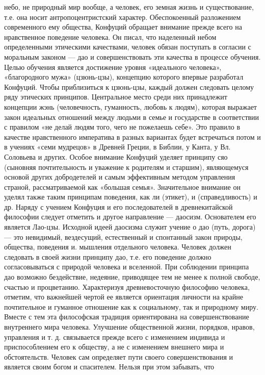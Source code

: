 \documentclass[12pt]{article}
\begin{document}
небо, не природный мир вообще, а человек, его земная жизнь и существование, т.е. она носит
антропоцентристский характер.
Обеспокоенный разложением современного ему общества, Конфуций обращает внимание прежде всего на
нравственное поведение человека. Он писал, что наделенный небом определенными этическими качествами,
человек обязан поступать в согласии с моральным законом — дао и совершенствовать эти качества в процессе
обучения. Целью обучения является достижение уровня «идеального человека», «благородного мужа» (цзюнь-цзы), концепцию которого впервые разработал Конфуций. Чтобы приблизиться к цзюнь-цзы, каждый должен
следовать целому ряду этических принципов. Центральное место среди них принадлежит концепции жэнь
(человечность, гуманность, любовь к людям), которая выражает закон идеальных отношений между людьми в
семье и государстве в соответствии с правилом «не делай людям того, чего не пожелаешь себе». Это правило в
качестве нравственного императива в разных вариантах будет встречаться потом и в учениях «семи мудрецов» в
Древней Греции, в Библии, у Канта, у Вл. Соловьева и других. Особое внимание Конфуций уделяет принципу
сяо (сыновняя почтительность и уважение к родителям и старшим), являющемуся основой других добродетелей
и самым эффективным методом управления страной, рассматриваемой как «большая семья». Значительное
внимание он уделял также таким принципам поведения, как ли (этикет), и (справедливость) и др.
Наряду с учением Конфуция и его последователей в древнекитайской философии следует отметить и другое
направление — даосизм. Основателем его является Лао-цзы. Исходной идеей даосизма служит учение о дао
(путь, дорога) — это невидимый, вездесущий, естественный и спонтанный закон природы, общества, поведения
и. мышления отдельного человека. Человек должен следовать в своей жизни принципу дао, т.е. его поведение
должно согласовываться с природой человека и вселенной. При соблюдении принципа дао возможно
бездействие, недеяние, приводящее тем не менее к полной свободе, счастью и процветанию.
Характеризуя древневосточную философию человека, отметим, что важнейшей чертой ее является ориентация
личности на крайне почтительное и гуманное отношение как к социальному, так и природному миру. Вместе с
тем эта философская традиция ориентирована на совершенствование внутреннего мира человека. Улучшение
общественной жизни, порядков, нравов, управления и т. д. связывается прежде всего с изменением индивида и
приспособлением его к обществу, а не с изменением внешнего мира и обстоятельств. Человек сам определяет
пути своего совершенствования и является своим богом и спасителем. Нельзя при этом забывать, что
\end{document}
